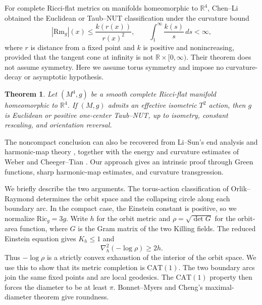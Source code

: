 \documentclass[letterpaper]{amsart}
\newtheorem{thm}{Theorem}[section]
\theoremstyle{definition}
\theoremstyle{remark}
\begin{document}
For complete Ricci-flat metrics on manifolds homeomorphic to
$\mathbb R^4$, Chen--Li \cite[Theorem~1.6]{notes-ChenLi} obtained the
Euclidean or Taub--NUT classification under the curvature bound
\[
 |\mathrm{Rm}_g|(x)\leq\frac{k(r(x))}{r(x)^2},
 \qquad
 \int_1^\infty\frac{k(s)}{s}\,ds<\infty,
\]
where $r$ is distance from a fixed point and $k$ is positive and
nonincreasing, provided that the tangent cone at infinity is not
$\mathbb R\times[0,\infty)$. Their theorem does not assume symmetry.
Here we assume torus symmetry and impose no curvature-decay or
asymptotic hypothesis.


\begin{thm}\label{notes-R4-classification}
Let $(M^4,g)$ be a smooth complete Ricci-flat manifold homeomorphic to
$\mathbb R^4$. If $(M,g)$ admits an effective isometric $T^2$ action, then
$g$ is Euclidean or positive one-center Taub--NUT, up to isometry,
constant rescaling, and orientation reversal.
\end{thm}


The noncompact conclusion can also be recovered from Li--Sun's end
analysis and harmonic-map theory \cite{notes-LiSunCompact,notes-LiSunHarmonic},
together with the energy and curvature estimates of Weber
\cite{notes-Weber} and Cheeger--Tian \cite{notes-CheegerTian}.
Our approach gives an intrinsic proof through Green functions, sharp
harmonic-map estimates, and curvature transgression.

We briefly describe the two arguments. The torus-action classification
of Orlik--Raymond \cite{notes-OrlikRaymond} determines the orbit space
and the collapsing circle along each boundary arc. In the compact case,
the Einstein constant is positive, so we normalize
$\mathrm{Ric}_g=3g$. Write $h$ for the orbit metric and
$\rho=\sqrt{\det G}$ for the orbit-area function, where $G$ is the Gram
matrix of the two Killing fields. The reduced Einstein equation gives
$K_h\leq1$ and
\[
 \nabla_h^2(-\log\rho)\geq2h.
\]
Thus $-\log\rho$ is a strictly convex exhaustion of the interior of the
orbit space. We use this to show that its metric completion is
$\mathrm{CAT}(1)$. The two boundary arcs join the same fixed points and
are local geodesics. The $\mathrm{CAT}(1)$ property then forces the
diameter to be at least $\pi$. Bonnet--Myers and Cheng's maximal-diameter
theorem \cite{notes-Cheng} give roundness.
\end{document}
